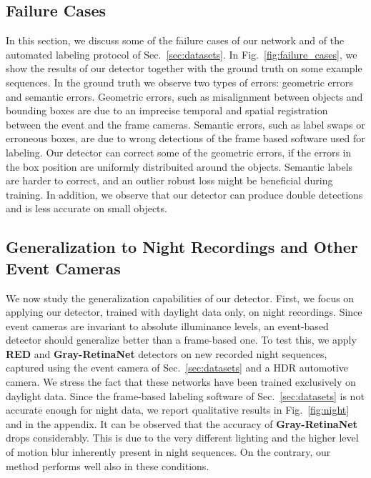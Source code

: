\documentclass{article}
\begin{document}
\subsection{Failure Cases}
\label{subsec:failure_cases}
In this section, we discuss some of the failure cases of our network and of the automated labeling protocol of Sec.~\ref{sec:datasets}. In Fig.~\ref{fig:failure_cases}, we show the results of our detector together with the ground truth on some example sequences. In the ground truth we observe two types of errors: geometric errors and semantic errors. Geometric errors, such as misalignment between objects and bounding boxes are due to an imprecise temporal and spatial registration between the event and the frame cameras. Semantic errors, such as label swaps or erroneous boxes, are due to wrong detections of the frame based software used for labeling. Our detector can correct some of the geometric errors, if the errors in the box position are uniformly distribuited around the objects.
Semantic labels are harder to correct, and an outlier robust loss might be beneficial during training. In addition, we observe that our detector can produce double detections and is less accurate on small objects. 

\subsection{Generalization to Night Recordings and Other Event Cameras}
\label{subsec:night_results} 
We now study the generalization capabilities of our detector.
First, we focus on applying our detector, trained with daylight data only, on night recordings.
Since event cameras are invariant to absolute illuminance levels, an event-based detector should 
generalize better than a frame-based one.
To test this, we apply \textbf{RED} and \textbf{Gray-RetinaNet} detectors on
new recorded night sequences, captured using the event camera of 
Sec.~\ref{sec:datasets} and a HDR automotive camera.
We stress the fact that these networks have been trained exclusively on daylight data. Since the frame-based labeling software of Sec.~\ref{sec:datasets} is not accurate enough for night data, we report qualitative results in Fig.~\ref{fig:night} and in the appendix.
It can be observed that the accuracy of \textbf{Gray-RetinaNet} drops considerably.
This is due to the very different lighting and the higher level of motion blur
inherently present in night sequences. On the contrary, our method performs
well also in these conditions. 
\end{document}
